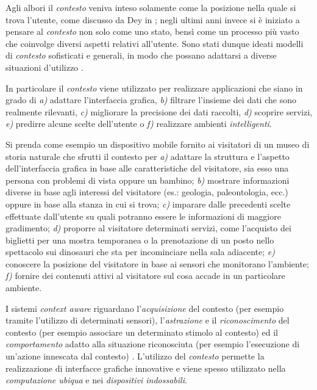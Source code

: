 Agli albori il \emph{contesto} veniva inteso solamente come la posizione nella quale si trova l'utente, come discusso da Dey in \cite{dey2001understanding}; negli ultimi anni invece si è iniziato a pensare al \emph{contesto} non solo come uno stato, bensì come un processo più vasto che coinvolge diversi aspetti relativi all'utente. Sono stati dunque ideati modelli di \emph{contesto} sofisticati e generali, in modo che possano adattarsi a diverse situazioni d'utilizzo \cite{DBLP:journals/sigmod/BolchiniCQST07} \cite{baldauf2007survey}.

In particolare il \emph{contesto} viene utilizzato per realizzare applicazioni che siano in grado di \emph{a)} adattare l'interfaccia grafica, \emph{b)} filtrare l'insieme dei dati che sono realmente rilevanti, \emph{c)} migliorare la precisione dei dati raccolti, \emph{d)} scoprire servizi, \emph{e)} predirre alcune scelte dell'utente o \emph{f)} realizzare ambienti \emph{intelligenti}.

Si prenda come esempio un dispositivo mobile fornito ai visitatori di un museo di storia naturale che sfrutti il contesto per \emph{a)} adattare la struttura e l'aspetto dell'interfaccia grafica in base alle caratteristiche del visitatore, sia esso una persona con problemi di vista oppure un bambino; \emph{b)} mostrare informazioni diverse in base agli interessi del visitatore (es.: geologia, paleontologia, ecc.) oppure in base alla stanza in cui si trova; \emph{c)} imparare dalle precedenti scelte effettuate dall'utente su quali potranno essere le informazioni di maggiore gradimento; \emph{d)} proporre al visitatore determinati servizi, come l'acquisto dei biglietti per una mostra temporanea o la prenotazione di un posto nello spettacolo sui dinosauri che sta per incominciare nella sala adiacente; \emph{e)} conoscere la posizione del visitatore in base ai sensori che monitorano l'ambiente; \emph{f)} fornire dei contenuti attivi al visitatore sul cosa accade in un particolare ambiente.

I sistemi \emph{context aware} riguardano l'\emph{acquisizione} del contesto (per esempio tramite l'utilizzo di determinati sensori), l'\emph{astrazione} e il \emph{riconoscimento} del contesto (per esempio associare un determinato stimolo al contesto) ed il \emph{comportamento} adatto alla situazione riconosciuta (per esempio l'esecuzione di un'azione innescata dal contesto) \cite{schmidt2003ubiquitous}. L'utilizzo del \emph{contesto} permette la realizzazione di interfacce grafiche innovative e viene spesso utilizzato nella \emph{computazione ubiqua} e nei \emph{dispositivi indossabili}.

